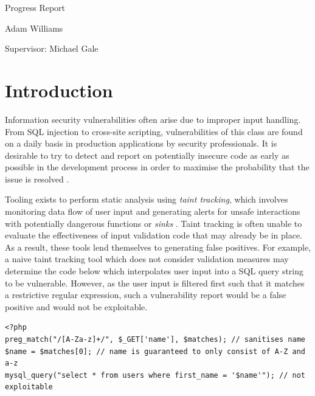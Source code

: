 \documentclass[a4paper]{article}
\begin{document}
\begin{titlepage}
    {\par}
    \vspace{1.25cm}
    \vspace{3.5cm}
    {\hspace{0.75cm}\Huge \sffamily Progress Report}
    \vspace{0.16cm}
    {\par}
    {\hspace{0.75cm}\large \sffamily Adam Williams}
    
    \vspace{0cm}
    {\par}
    {\hspace{0.75cm}\large \sffamily Supervisor: Michael Gale}
    \vfill
\end{titlepage}
\restoregeometry
\restorepagecolor
\tableofcontents
\pagebreak[5]
    
    \section{Introduction}
    
    Information security vulnerabilities often arise due to improper input handling. From SQL injection to cross-site scripting, vulnerabilities of this class are found on a daily basis in production applications by security professionals. It is desirable to try to detect and report on potentially insecure code as early as possible in the development process in order to maximise the probability that the issue is resolved \citep{Sadowski:2018:LBS:3200906.3188720}.
    
    Tooling exists to perform static analysis using \emph{taint tracking}, which involves monitoring data flow of user input and generating alerts for unsafe interactions with potentially dangerous functions or \emph{sinks} \citep{jovanovic2006pixy}. Taint tracking is often unable to evaluate the effectiveness of input validation code that may already be in place. As a result, these tools lend themselves to generating false positives. For example, a naive taint tracking tool which does not consider validation measures may determine the code below which interpolates user input into a SQL query string to be vulnerable. However, as the user input is filtered first such that it matches a restrictive regular expression, such a vulnerability report would be a false positive and would not be exploitable.
    
    \begin{verbatim}
<?php
preg_match("/[A-Za-z]+/", $_GET['name'], $matches); // sanitises name
$name = $matches[0]; // name is guaranteed to only consist of A-Z and a-z
mysql_query("select * from users where first_name = '$name'"); // not exploitable
    \end{verbatim}
    
\end{document}
